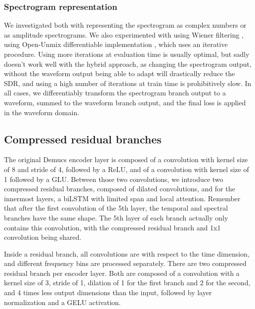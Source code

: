 \documentclass[10pt,a4paper,onecolumn]{article}
\begin{document}
\hypertarget{spectrogram-representation}{%
\subsubsection{Spectrogram
representation}\label{spectrogram-representation}}

We investigated both with representing the spectrogram as complex
numbers \citep{cac} or as amplitude spectrograms.
We also experimented with using Wiener filtering \citep{wiener}, using Open-Unmix
differentiable implementation \citep{umx}, which uses an iterative procedure.
Using more iterations at evaluation
time is usually optimal, but sadly doesn't work well with the hybrid
approach, as changing the spectrogram output, without the waveform
output being able to adapt will drastically reduce the SDR, and using a
high number of iterations at train time is prohibitively slow. In all
cases, we differentiably transform the spectrogram branch output to a
waveform, summed to the waveform branch output, and the final loss is
applied in the waveform domain.

\hypertarget{compressed-residual-branches}{%
\subsection{Compressed residual
branches}\label{compressed-residual-branches}}

The original Demucs encoder layer is composed of a convolution with
kernel size of 8 and stride of 4, followed by a ReLU, and of a
convolution with kernel size of 1 followed by a GLU. Between those two
convolutions, we introduce two compressed residual branches, composed of
dilated convolutions, and for the innermost layers, a biLSTM with
limited span and local attention. Remember that after the first
convolution of the 5th layer, the temporal and spectral branches have
the same shape. The 5th layer of each branch actually only contains this
convolution, with the compressed residual branch and 1x1 convolution
being shared.

Inside a residual branch, all convolutions are with respect to the time
dimension, and different frequency bins are processed separately. There
are two compressed residual branch per encoder layer. Both are composed
of a convolution with a kernel size of 3, stride of 1, dilation of 1 for
the first branch and 2 for the second, and 4 times less output
dimensions than the input, followed by layer normalization
\citep{layernorm} and a GELU activation.
\end{document}
